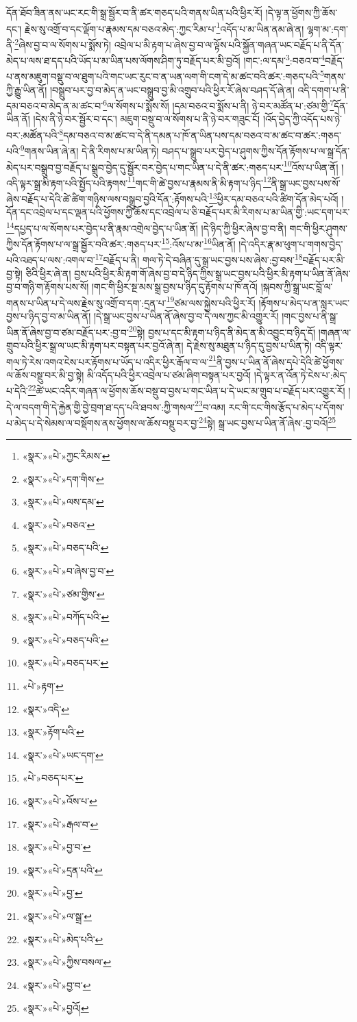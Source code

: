 དོན་ཐོབ་ཟིན་ནས་ཡང་རང་གི་སྒྲ་སྦྱོར་བ་ནི་ཚར་གཅད་པའི་གནས་ཡིན་པའི་ཕྱིར་རོ། །དེ་ལྟ་ན་ཕྱོགས་ཀྱི་ཆོས་དང་། རྗེས་སུ་འགྲོ་བ་དང་ལྡོག་པ་རྣམས་དམ་བཅའ་མེད་:ཀྱང་རིམ་པ་\footnote{«སྣར་»«པེ་»ཀྱང་རིམས་}འདོད་པ་མ་ཡིན་ནམ་ཞེ་ན། ལྷག་མ་:དག་ནི་\footnote{«སྣར་»«པེ་»དག་གིས་}ཞེས་བྱ་བ་ལ་སོགས་པ་སྨོས་ཏེ། འབྲེལ་པ་མི་རྟག་པ་ཞེས་བྱ་བ་ལ་ལྟོས་པའི་སྐྱོན་གཞན་ཡང་བརྗོད་པ་ནི་དོན་མེད་པ་ལས་ཐ་དད་པའི་ཡོད་པ་མ་ཡིན་པས་ལོགས་ཤིག་ཏུ་བརྗོད་པར་མི་བྱའོ། །གང་:ལ་དམ་\footnote{«སྣར་»«པེ་»ལས་དམ་}:བཅའ་བ་\footnote{«སྣར་»«པེ་»བཅའ་}བརྗོད་པ་ནས་མཇུག་བསྡུ་བ་ལ་ཐུག་པའི་གང་ཡང་རུང་བ་ན་ཡན་ལག་གི་ངག་དེ་མ་ཚང་བའི་ཚར་:གཅད་པའི་\footnote{«སྣར་»«པེ་»བཅད་པའི་}གནས་ཀྱི་རྒྱུ་ཡིན་ནོ། །བསྒྲུབ་པར་བྱ་བ་མེད་ན་ཡང་བསྒྲུབ་བྱ་མི་འགྲུབ་པའི་ཕྱིར་རོ་ཞེས་བཤད་དོ་ཞེ་ན། འདི་དགག་པ་ནི་དམ་བཅའ་བ་མེད་ན་མ་ཚང་བ་\footnote{«སྣར་»«པེ་»བ་ཞེས་བྱ་བ་}ལ་སོགས་པ་སྨོས་སོ། །དམ་བཅའ་བ་སྨོས་པ་ནི། ཉེ་བར་མཚོན་པ་:ཙམ་གྱི་\footnote{«སྣར་»«པེ་»ཙམ་གྱིས་}དོན་ཡིན་ནོ། །དེས་ནི་ཉེ་བར་སྦྱོར་བ་དང་། མཇུག་བསྡུ་བ་ལ་སོགས་པ་ནི་ཉེ་བར་གཟུང་ངོ། །འོད་བྱེད་ཀྱི་འདོད་པས་ཉེ་བར་:མཚོན་པའི་\footnote{«སྣར་»«པེ་»བཀོད་པའི་}དམ་བཅའ་བ་མ་ཚང་བ་དེ་ནི་དམན་པ་ཁོ་ན་ཡིན་པས་དམ་བཅའ་བ་མ་ཚང་བ་ཚར་:གཅད་པའི་\footnote{«སྣར་»«པེ་»བཅད་པའི་}གནས་ཡིན་ཞེ་ན། དེ་ནི་རིགས་པ་མ་ཡིན་ཏེ། བཤད་པ་སྒྲུབ་པར་བྱེད་པ་ཤུགས་ཀྱིས་དོན་རྟོགས་པ་ལ་སྒྲ་དོན་མེད་པར་བསྒྲུབ་བྱ་བརྗོད་པ་སྒྲུབ་བྱེད་དུ་སྦྱོར་བར་བྱེད་པ་གང་ཡིན་པ་དེ་ནི་ཚར་:གཅད་པར་\footnote{«སྣར་»«པེ་»བཅད་པར་}འོས་པ་ཡིན་ནོ། །འདི་ལྟར་སྒྲ་མི་རྟག་པའི་སྤྱོད་པའི་རྟགས་\footnote{«པེ་»རྟག་}གང་གི་ཚེ་བྱས་པ་རྣམས་ནི་མི་རྟག་པ་ཉིད་\footnote{«སྣར་»འདི་}ནི་སྒྲ་ཡང་བྱས་པས་སོ་ཞེས་བརྗོད་པ་དེའི་ཚེ་ཚིག་གཉིས་ལས་བསྒྲུབ་བྱའི་དོན་:རྟོགས་པའི་\footnote{«སྣར་»རྟོག་པའི་}ཕྱིར་དམ་བཅའ་པའི་ཚིག་དོན་མེད་པའོ། །དོན་དང་འབྲེལ་པ་དང་ལྡན་པའི་ཕྱོགས་ཀྱི་ཆོས་དང་འབྲེལ་པ་ཅི་བརྗོད་པར་མི་རིགས་པ་མ་ཡིན་གྱི་:ཡང་དག་པར་\footnote{«སྣར་»«པེ་»ཡང་དག་}དཔྱད་པ་ལ་སོགས་པར་བྱེད་པ་ནི་རྣམ་འགྲེལ་བྱེད་པ་ཡིན་ནོ། །དེ་ཉིད་ཀྱི་ཕྱིར་ཞེས་བྱ་བ་ནི། གང་གི་ཕྱིར་ཤུགས་ཀྱིས་དོན་རྟོགས་པ་ལ་སྒྲ་སྦྱོར་བའི་ཚར་:གཅད་པར་\footnote{«པེ་»བཅད་པར་}:འོས་པ་མ་\footnote{«སྣར་»«པེ་»འོས་པ་}ཡིན་ནོ། །དེ་འདིར་རྣ་མ་ཕུག་པ་གགས་བྱེད་པའི་འཐད་པ་ལས་:འགལ་བ་\footnote{«སྣར་»«པེ་»རྒལ་བ་}བརྗོད་པ་ནི། གལ་ཏེ་དེ་བཞིན་དུ་སྒྲ་ཡང་བྱས་པས་ཞེས་:བྱ་བས་\footnote{«སྣར་»«པེ་»བྱ་བ་}བརྗོད་པར་མི་བྱ་སྟེ། ཅིའི་ཕྱིར་ཞེ་ན། བྱས་པའི་ཕྱིར་མི་རྟག་གོ་ཞེས་བྱ་བ་དེ་ཉིད་ཀྱིས་སྒྲ་ཡང་བྱས་པའི་ཕྱིར་མི་རྟག་པ་ཡིན་ནོ་ཞེས་བྱ་བ་གཉི་ག་རྟོགས་པས་སོ། །གང་གི་ཕྱིར་སྔ་མས་སྒྲ་བྱས་པ་ཉིད་དུ་རྟོགས་པ་ཁོ་ནའོ། །སྐབས་ཀྱི་སྒྲ་ཡང་བློ་ལ་གནས་པ་ཡིན་པ་དེ་ལས་རྗེས་སུ་འགྲོ་བ་དག་:དྲན་པ་\footnote{«སྣར་»«པེ་»དྲན་པའི་}ཙམ་ལས་སྐྱེས་པའི་ཕྱིར་རོ། །རྟོགས་པ་མེད་པ་ན་སླར་ཡང་བྱས་པ་ཉིད་བྱ་བ་མ་ཡིན་ནོ། །དེ་སྒྲ་ཡང་བྱས་པ་ཡིན་ནོ་ཞེས་བྱ་བ་དེ་ལས་ཀྱང་མི་འགྱུར་རོ། །གང་བྱས་པ་ནི་སྒྲ་ཡིན་ནོ་ཞེས་བྱ་བ་ཙམ་བརྗོད་པར་:བྱ་བ་\footnote{«སྣར་»«པེ་»བྱ་}སྟེ། བྱས་པ་དང་མི་རྟག་པ་ཉིད་ནི་མེད་ན་མི་འབྱུང་བ་ཉིད་དོ། །གཞན་ལ་གྲུབ་པའི་ཕྱིར་སྒྲ་ལ་ཡང་མི་རྟག་པར་བསྟན་པར་བྱའོ་ཞེ་ན། དེ་རྗེས་སུ་མཐུན་པ་ཉིད་དུ་བྱས་པ་ཡིན་ཏེ། འདི་ལྟར་གལ་ཏེ་རེས་འགའ་ངེས་པར་རྟོགས་པ་ཡོད་པ་འདིར་ཕྱིར་རྒོལ་བ་ལ་\footnote{«སྣར་»«པེ་»ལ་སྒྲ་}ནི་བྱས་པ་ཡིན་ནོ་ཞེས་དཔེ་དེའི་ཚེ་ཕྱོགས་ལ་ཆོས་བསྡུ་བར་མི་བྱ་སྟེ། མི་འདོད་པའི་ཕྱིར་འབྲེལ་པ་ཙམ་ཞིག་བསྟན་པར་བྱའོ། །དེ་ལྟར་ན་འོན་ཏེ་ངེས་པ་:མེད་པ་དེའི་\footnote{«སྣར་»«པེ་»མེད་པའི་}ཚེ་ཡང་འདིར་གཞན་ལ་ཕྱོགས་ཆོས་བསྡུ་བ་བྱས་པ་གང་ཡིན་པ་དེ་ཡང་མ་གྲུབ་པ་བརྗོད་པར་འགྱུར་རོ། །དེ་ལ་བདག་གི་དེ་རྐྱེན་གྱི་བྱེ་བྲག་ཐ་དད་པའི་ཐབས་:ཀྱི་གསལ་\footnote{«སྣར་»«པེ་»ཀྱིས་བསལ་}བ་འམ། རང་གི་ངང་གིས་རྩོད་པ་མེད་པ་དོགས་པ་མེད་པ་དེ་སེམས་ལ་བསྡོགས་ནས་ཕྱོགས་ལ་ཆོས་བསྡུ་བར་བྱ་\footnote{«སྣར་»«པེ་»བྱ་བ་}སྟེ། སྒྲ་ཡང་བྱས་པ་ཡིན་ནོ་ཞེས་:བྱ་བའོ།\footnote{«སྣར་»«པེ་»བྱའོ།} 